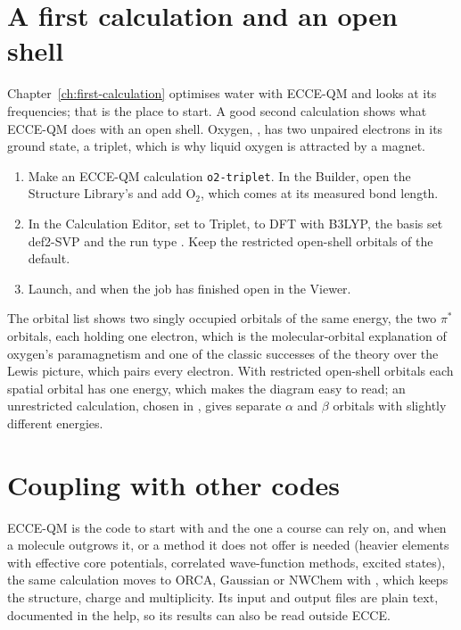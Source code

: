\section{A first calculation and an open shell}
Chapter~\ref{ch:first-calculation} optimises water with ECCE-QM and looks at its frequencies; that is the place to start. A good second calculation shows what ECCE-QM does with an open shell. Oxygen, , has two unpaired electrons in its ground state, a triplet, which is why liquid oxygen is attracted by a magnet.
\begin{enumerate}
	\item Make an ECCE-QM calculation \texttt{o2-triplet}. In the Builder, open the Structure Library's  and add O$_2$, which comes at its measured bond length.
	\item In the Calculation Editor, set  to Triplet,  to DFT with B3LYP, the basis set def2-SVP and the run type . Keep the restricted open-shell orbitals of the default.
	\item Launch, and when the job has finished open  in the Viewer.
\end{enumerate}

The orbital list shows two singly occupied orbitals of the same energy, the two $\pi^*$ orbitals, each holding one electron, which is the molecular-orbital explanation of oxygen's paramagnetism and one of the classic successes of the theory over the Lewis picture, which pairs every electron. With restricted open-shell orbitals each spatial orbital has one energy, which makes the diagram easy to read; an unrestricted calculation, chosen in , gives separate $\alpha$ and $\beta$ orbitals with slightly different energies.

\section{Coupling with other codes}
ECCE-QM is the code to start with and the one a course can rely on, and when a molecule outgrows it, or a method it does not offer is needed (heavier elements with effective core potentials, correlated wave-function methods, excited states), the same calculation moves to ORCA, Gaussian or NWChem with , which keeps the structure, charge and multiplicity. Its input and output files are plain text, documented in the help, so its results can also be read outside ECCE.
